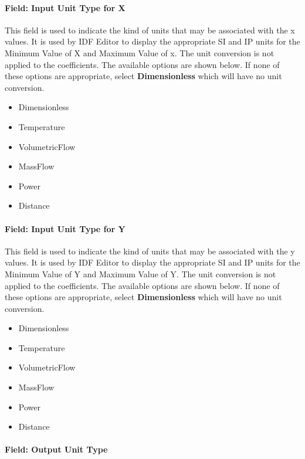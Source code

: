 \paragraph{Field: Input Unit Type for X}\label{field-input-unit-type-for-x-10}

This field is used to indicate the kind of units that may be associated with the x values. It is used by IDF Editor to display the appropriate SI and IP units for the Minimum Value of X and Maximum Value of x. The unit conversion is not applied to the coefficients. The available options are shown below. If none of these options are appropriate, select \textbf{Dimensionless} which will have no unit conversion.

\begin{itemize}
\item
  Dimensionless
\item
  Temperature
\item
  VolumetricFlow
\item
  MassFlow
\item
  Power
\item
  Distance
\end{itemize}

\paragraph{Field: Input Unit Type for Y}\label{field-input-unit-type-for-y-5}

This field is used to indicate the kind of units that may be associated with the y values. It is used by IDF Editor to display the appropriate SI and IP units for the Minimum Value of Y and Maximum Value of Y. The unit conversion is not applied to the coefficients. The available options are shown below. If none of these options are appropriate, select \textbf{Dimensionless} which will have no unit conversion.

\begin{itemize}
\item
  Dimensionless
\item
  Temperature
\item
  VolumetricFlow
\item
  MassFlow
\item
  Power
\item
  Distance
\end{itemize}

\paragraph{Field: Output Unit Type}\label{field-output-unit-type-9}

